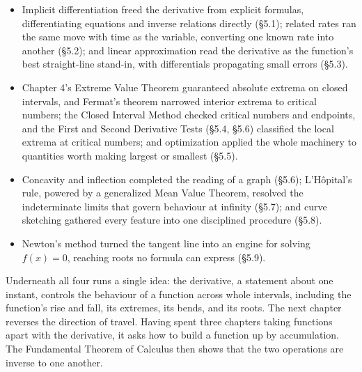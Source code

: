 \documentclass[a4paper,12pt,oneside]{memoir}
\begin{document}
\begin{itemize}
  \item {} Implicit differentiation freed the derivative from explicit formulas, differentiating equations and inverse relations directly (§5.1); related rates ran the same move with time as the variable, converting one known rate into another (§5.2); and linear approximation read the derivative as the function’s best straight-line stand-in, with differentials propagating small errors (§5.3).
  \item {} Chapter 4’s Extreme Value Theorem guaranteed absolute extrema on closed intervals, and Fermat’s theorem narrowed interior extrema to critical numbers; the Closed Interval Method checked critical numbers and endpoints, and the First and Second Derivative Tests (§5.4, §5.6) classified the local extrema at critical numbers; and optimization applied the whole machinery to quantities worth making largest or smallest (§5.5).
  \item {} Concavity and inflection completed the reading of a graph (§5.6); L’Hôpital’s rule, powered by a generalized Mean Value Theorem, resolved the indeterminate limits that govern behaviour at infinity (§5.7); and curve sketching gathered every feature into one disciplined procedure (§5.8).
  \item {} Newton’s method turned the tangent line into an engine for solving \(f(x) = 0\), reaching roots no formula can express (§5.9).
\end{itemize}
Underneath all four runs a single idea: the derivative, a statement about one instant, controls the behaviour of a function across whole intervals, including the function’s rise and fall, its extremes, its bends, and its roots. The next chapter reverses the direction of travel. Having spent three chapters taking functions apart with the derivative, it asks how to build a function up by accumulation. The Fundamental Theorem of Calculus then shows that the two operations are inverse to one another.
\end{document}
